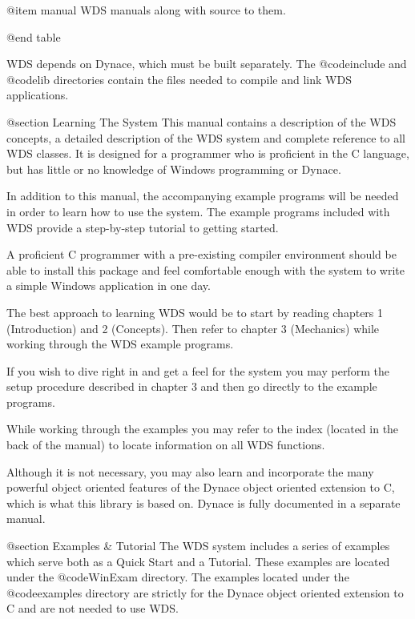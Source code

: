 @item manual
WDS manuals along with source to them.

@end table


WDS depends on Dynace, which must be built separately.  The
@code{include} and @code{lib} directories contain the files needed
to compile and link WDS applications.





@section Learning The System
This manual contains a description of the WDS concepts, a detailed
description of the WDS system and complete reference to all WDS classes.
It is designed for a programmer who is proficient in the C language, but
has little or no knowledge of Windows programming or Dynace.


In addition to this manual, the accompanying example programs will be
needed in order to learn how to use the system.  The example programs
included with WDS provide a step-by-step tutorial to getting started.


A proficient C programmer with a pre-existing compiler environment
should be able to install this package and feel comfortable enough with
the system to write a simple Windows application in one day.


The best approach to learning WDS would be to start by reading chapters
1 (Introduction) and 2 (Concepts).  Then refer to chapter 3 (Mechanics)
while working through the WDS example programs.

If you wish to dive right in and get a feel for the system you may
perform the setup procedure described in chapter 3 and then go directly
to the example programs.

While working through the examples you may refer to the index (located
in the back of the manual) to locate information on all WDS functions.

Although it is not necessary, you may also learn and incorporate the
many powerful object oriented features of the Dynace object oriented
extension to C, which is what this library is based on.  Dynace is fully
documented in a separate manual.






@section Examples & Tutorial
The WDS system includes a series of examples which serve both as a Quick
Start and a Tutorial.  These examples are located under the
@code{WinExam} directory.  The examples located under the
@code{examples} directory are strictly for the Dynace object
oriented extension to C and are not needed to use WDS.


